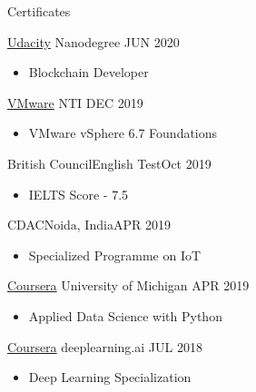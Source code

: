 \documentclass[]{mcdowellcv}
\begin{document}
	
	\begin{cvsection}{Certificates}
		\begin{cvsubsection}{\href{https://graduation.udacity.com/confirm/DTZZCCYZ}{Udacity}}
			{Nanodegree}
			{JUN 2020}
			\begin{itemize}
				\item Blockchain Developer
			\end{itemize}
		\end{cvsubsection}

		\begin{cvsubsection}{\href{https://www.youracclaim.com/badges/4e505240-2075-45c8-9e7a-2a1b01096ac0}{VMware}}
	    {NTI}
	   {DEC 2019}
	    \begin{itemize}
		\item VMware vSphere 6.7 Foundations
     	\end{itemize}
      \end{cvsubsection}
		\begin{cvsubsection}{British Council}{English Test}{Oct 2019}
			\begin{itemize}
				\item IELTS Score - 7.5
			\end{itemize}
		\end{cvsubsection}
		\begin{cvsubsection}{CDAC}{Noida, India}{APR 2019}
			\begin{itemize}
				\item Specialized Programme on IoT
			\end{itemize}
		\end{cvsubsection}
		\begin{cvsubsection}{\href{https://www.coursera.org/account/accomplishments/specialization/certificate/54XBCHQ9B8LY}{Coursera}}
			{University of Michigan}
			{APR 2019}
			\begin{itemize}
				\item Applied Data Science with Python
			\end{itemize}
		\end{cvsubsection}
		\begin{cvsubsection}
			{\href{https://www.coursera.org/account/accomplishments/specialization/certificate/LXSXVVTWLGMQ}{Coursera}}
			{deeplearning.ai}
			{JUL 2018}
			\begin{itemize}
				\item Deep Learning Specialization
			\end{itemize}
		\end{cvsubsection}
		\begin{cvsubsection}

\end{cvsubsection}
\end{cvsection}
\end{document}
